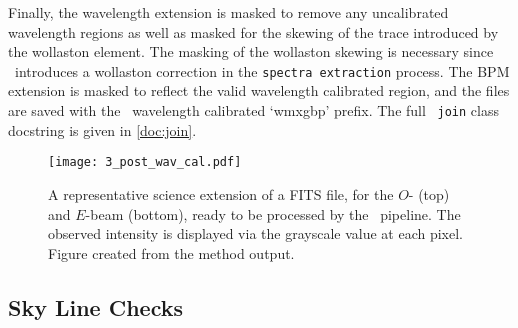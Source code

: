 Finally, the wavelength extension is masked to remove any uncalibrated wavelength regions as well as masked for the skewing of the trace introduced by the wollaston element. The masking of the wollaston skewing is necessary since \polsalt\ introduces a wollaston correction in the \texttt{spectra extraction} process. The \gls{BPM} extension is masked to reflect the valid wavelength calibrated region, and the files are saved with the \polsalt\ wavelength calibrated `wmxgbp' prefix.
The full \stops\ \texttt{join} class docstring is given in \autoref{doc:join}.

\begin{figure}[t]
    \centering
    \texttt{[image: 3\_post\_wav\_cal.pdf]}
    \caption{A representative science extension of a \gls{FITS} file, for the $O$- (top) and $E$-beam (bottom), ready to be processed by the \polsalt\ pipeline. The observed intensity is displayed via the grayscale value at each pixel.
    Figure created from the  method output.}
    \label{fig:polsalt_post_wav_cal}
\end{figure}

\subsection{Sky Line Checks} \label{subsec:stops_skyline}



